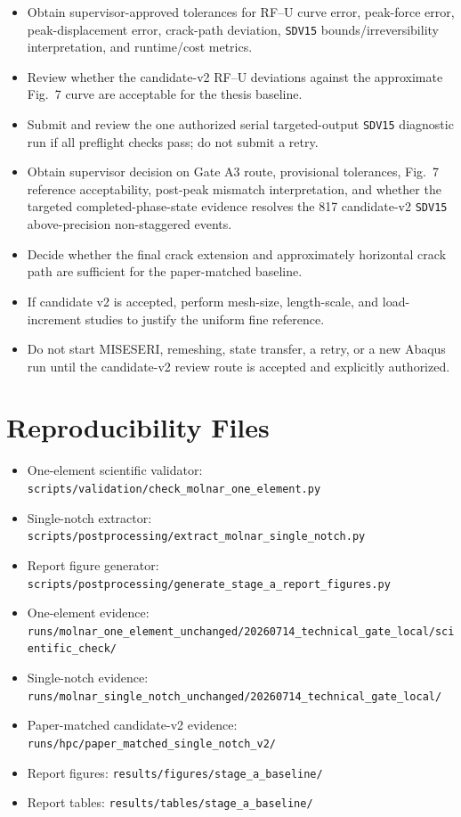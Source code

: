 \documentclass[11pt,a4paper]{article}
\begin{document}
\begin{itemize}
  \item Obtain supervisor-approved tolerances for RF--U curve error, peak-force error, peak-displacement error, crack-path deviation, \texttt{SDV15} bounds/irreversibility interpretation, and runtime/cost metrics.
  \item Review whether the candidate-v2 RF--U deviations against the approximate Fig.~7 curve are acceptable for the thesis baseline.
  \item Submit and review the one authorized serial targeted-output \texttt{SDV15} diagnostic run if all preflight checks pass; do not submit a retry.
  \item Obtain supervisor decision on Gate A3 route, provisional tolerances, Fig.~7 reference acceptability, post-peak mismatch interpretation, and whether the targeted completed-phase-state evidence resolves the 817 candidate-v2 \texttt{SDV15} above-precision non-staggered events.
  \item Decide whether the final crack extension and approximately horizontal crack path are sufficient for the paper-matched baseline.
  \item If candidate v2 is accepted, perform mesh-size, length-scale, and load-increment studies to justify the uniform fine reference.
  \item Do not start MISESERI, remeshing, state transfer, a retry, or a new Abaqus run until the candidate-v2 review route is accepted and explicitly authorized.
\end{itemize}

\section*{Reproducibility Files}

\begin{itemize}
  \item One-element scientific validator: \texttt{scripts/validation/check\_molnar\_one\_element.py}
  \item Single-notch extractor: \texttt{scripts/postprocessing/extract\_molnar\_single\_notch.py}
  \item Report figure generator: \texttt{scripts/postprocessing/generate\_stage\_a\_report\_figures.py}
  \item One-element evidence: \texttt{runs/molnar\_one\_element\_unchanged/20260714\_technical\_gate\_local/scientific\_check/}
  \item Single-notch evidence: \texttt{runs/molnar\_single\_notch\_unchanged/20260714\_technical\_gate\_local/}
  \item Paper-matched candidate-v2 evidence: \texttt{runs/hpc/paper\_matched\_single\_notch\_v2/}
  \item Report figures: \texttt{results/figures/stage\_a\_baseline/}
  \item Report tables: \texttt{results/tables/stage\_a\_baseline/}
\end{itemize}
\end{document}
